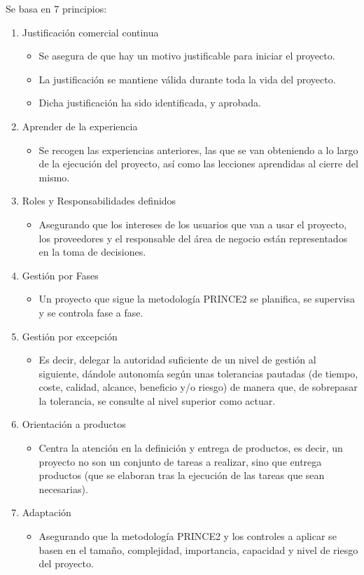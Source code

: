 Se basa en 7 principios:
\begin{enumerate}
	\item Justificación comercial continua
	\begin{itemize}
		\item Se asegura de que hay un motivo justificable para iniciar el proyecto.
		\item La justificación se mantiene válida durante toda la vida del proyecto.
		\item Dicha justificación ha sido identificada, y aprobada.
	\end{itemize}
	\item Aprender de la experiencia
	\begin{itemize}
		\item Se recogen las experiencias anteriores, las que se van obteniendo a lo largo de la ejecución del proyecto, así como las lecciones aprendidas al cierre del mismo.
	\end{itemize}
	\item Roles y Responsabilidades definidos
	\begin{itemize}
		\item Asegurando que los intereses de los usuarios que van a usar el proyecto, los proveedores y el responsable del área de negocio están representados en la toma de decisiones.
	\end{itemize}
	\item Gestión por Fases
	\begin{itemize}
		\item Un proyecto que sigue la metodología PRINCE2 se planifica, se supervisa y se controla fase a fase.
	\end{itemize}
	\item Gestión por excepción
	\begin{itemize}
		\item Es decir, delegar la autoridad suficiente de un nivel de gestión al siguiente, dándole autonomía según unas tolerancias pautadas (de tiempo, coste, calidad, alcance, beneficio y/o riesgo) de manera que, de sobrepasar la tolerancia, se consulte al nivel superior como actuar.
	\end{itemize}
	\item Orientación a productos
	\begin{itemize}
		\item Centra la atención en la definición y entrega de productos, es decir, un proyecto no son un conjunto de tareas a realizar, sino que entrega productos (que se elaboran tras la ejecución de las tareas que sean necesarias).
	\end{itemize}
	\item Adaptación
	\begin{itemize}
		\item Asegurando que la metodología PRINCE2 y los controles a aplicar se basen en el tamaño, complejidad, importancia, capacidad y nivel de riesgo del proyecto.
	\end{itemize}	
\end{enumerate}


